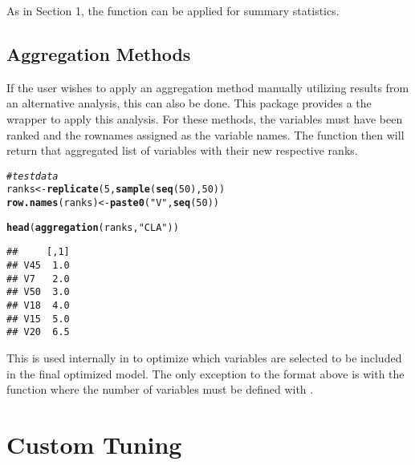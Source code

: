 \documentclass[12pt]{article}\usepackage[]{graphicx}\usepackage[usenames,dvipsnames]{color}
\makeatletter
\newcommand{\hlnum}[1]{\textcolor[rgb]{0.686,0.059,0.569}{#1}}%
\newcommand{\hlstr}[1]{\textcolor[rgb]{0.192,0.494,0.8}{#1}}%
\newcommand{\hlcom}[1]{\textcolor[rgb]{0.678,0.584,0.686}{\textit{#1}}}%
\newcommand{\hlstd}[1]{\textcolor[rgb]{0.345,0.345,0.345}{#1}}%
\newcommand{\hlkwb}[1]{\textcolor[rgb]{0.69,0.353,0.396}{#1}}%
\newcommand{\hlkwd}[1]{\textcolor[rgb]{0.737,0.353,0.396}{\textbf{#1}}}%
\newenvironment{kframe}{%
 \def\at@end@of@kframe{}%
 \ifinner\ifhmode%
  \def\at@end@of@kframe{\end{minipage}}%
  \begin{minipage}{\columnwidth}%
 \fi\fi%
 \def\FrameCommand##1{\hskip\@totalleftmargin \hskip-\fboxsep
 \colorbox{shadecolor}{##1}\hskip-\fboxsep
     \hskip-\linewidth \hskip-\@totalleftmargin \hskip\columnwidth}%
 \MakeFramed {\advance\hsize-\width
   \@totalleftmargin\z@ \linewidth\hsize
   \@setminipage}}%
 {\par\unskip\endMakeFramed%
 \at@end@of@kframe}
\newenvironment{knitrout}{}{} %
\makeatother
\begin{document}
As in Section 1, the  function can be applied
for summary statistics.

\newpage
\subsection{Aggregation Methods}

If the user wishes to apply an aggregation method manually utilizing results
from an alternative analysis, this can also be done.  This package provides
a the wrapper  to apply this analysis.  For these 
methods, the variables must have been ranked and the rownames assigned as the
variable names.  The function then will return that aggregated list of 
variables with their new respective ranks.

\begin{knitrout}
\color{fgcolor}\begin{kframe}
\begin{alltt}
\hlcom{# test data}
\hlstd{ranks} \hlkwb{<-} \hlkwd{replicate}\hlstd{(}\hlnum{5}\hlstd{,} \hlkwd{sample}\hlstd{(}\hlkwd{seq}\hlstd{(}\hlnum{50}\hlstd{),} \hlnum{50}\hlstd{))}
\hlkwd{row.names}\hlstd{(ranks)} \hlkwb{<-} \hlkwd{paste0}\hlstd{(}\hlstr{"V"}\hlstd{,} \hlkwd{seq}\hlstd{(}\hlnum{50}\hlstd{))}

\hlkwd{head}\hlstd{(}\hlkwd{aggregation}\hlstd{(ranks,} \hlstr{"CLA"}\hlstd{))}
\end{alltt}
\begin{verbatim}
##     [,1]
## V45  1.0
## V7   2.0
## V50  3.0
## V18  4.0
## V15  5.0
## V20  6.5
\end{verbatim}
\end{kframe}
\end{knitrout}

This is used internally in  to optimize which
variables are selected to be included in the final optimized model.  The only
exception to the format above is with the  function where the 
number of variables must be defined with .

\newpage
\maketitle
\section{Custom Tuning}
\end{document}
